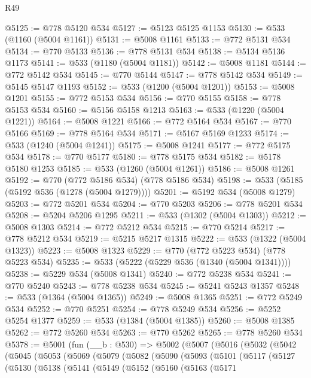 \begin{lexlean}{R49}
\begin{coremodule}
@5125 := @778 @5120 @534
@5127 := @5123 @5125 @1153
@5130 := @533 (@1160 (@5004 @1161))
@5131 := @5008 @1161
@5133 := @772 @5131 @534
@5134 := @770 @5133
@5136 := @778 @5131 @534
@5138 := @5134 @5136 @1173
@5141 := @533 (@1180 (@5004 @1181))
@5142 := @5008 @1181
@5144 := @772 @5142 @534
@5145 := @770 @5144
@5147 := @778 @5142 @534
@5149 := @5145 @5147 @1193
@5152 := @533 (@1200 (@5004 @1201))
@5153 := @5008 @1201
@5155 := @772 @5153 @534
@5156 := @770 @5155
@5158 := @778 @5153 @534
@5160 := @5156 @5158 @1213
@5163 := @533 (@1220 (@5004 @1221))
@5164 := @5008 @1221
@5166 := @772 @5164 @534
@5167 := @770 @5166
@5169 := @778 @5164 @534
@5171 := @5167 @5169 @1233
@5174 := @533 (@1240 (@5004 @1241))
@5175 := @5008 @1241
@5177 := @772 @5175 @534
@5178 := @770 @5177
@5180 := @778 @5175 @534
@5182 := @5178 @5180 @1253
@5185 := @533 (@1260 (@5004 @1261))
@5186 := @5008 @1261
@5192 := @770 (@772 @5186 @534) (@778 @5186 @534)
@5198 := @533 (@5185 (@5192 @536 (@1278 (@5004 @1279))))
@5201 := @5192 @534 (@5008 @1279)
@5203 := @772 @5201 @534
@5204 := @770 @5203
@5206 := @778 @5201 @534
@5208 := @5204 @5206 @1295
@5211 := @533 (@1302 (@5004 @1303))
@5212 := @5008 @1303
@5214 := @772 @5212 @534
@5215 := @770 @5214
@5217 := @778 @5212 @534
@5219 := @5215 @5217 @1315
@5222 := @533 (@1322 (@5004 @1323))
@5223 := @5008 @1323
@5229 := @770 (@772 @5223 @534) (@778 @5223 @534)
@5235 := @533 (@5222 (@5229 @536 (@1340 (@5004 @1341))))
@5238 := @5229 @534 (@5008 @1341)
@5240 := @772 @5238 @534
@5241 := @770 @5240
@5243 := @778 @5238 @534
@5245 := @5241 @5243 @1357
@5248 := @533 (@1364 (@5004 @1365))
@5249 := @5008 @1365
@5251 := @772 @5249 @534
@5252 := @770 @5251
@5254 := @778 @5249 @534
@5256 := @5252 @5254 @1377
@5259 := @533 (@1384 (@5004 @1385))
@5260 := @5008 @1385
@5262 := @772 @5260 @534
@5263 := @770 @5262
@5265 := @778 @5260 @534
@5378 := @5001
    (fun (__b : @530) =>
    @5002
      (@5007
        (@5016
          (@5032
            (@5042
              (@5045
                (@5053
                  (@5069
                    (@5079
                      (@5082
                        (@5090
                          (@5093
                            (@5101
                              (@5117
                                (@5127
                                  (@5130
                                    (@5138
                                      (@5141
                                        (@5149
                                          (@5152
                                            (@5160
                                              (@5163
                                                (@5171

\end{coremodule}
\end{lexlean}
